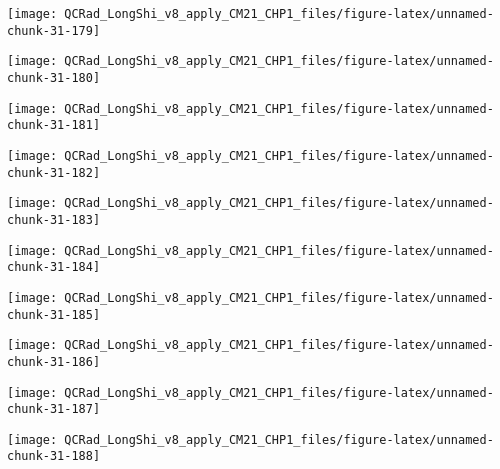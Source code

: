 \documentclass[
  10pt,
  a4paper,oneside]{article}
\begin{document}
\begin{center}\texttt{[image: QCRad\_LongShi\_v8\_apply\_CM21\_CHP1\_files/figure-latex/unnamed-chunk-31-179]} \end{center}

\begin{center}\texttt{[image: QCRad\_LongShi\_v8\_apply\_CM21\_CHP1\_files/figure-latex/unnamed-chunk-31-180]} \end{center}

\begin{center}\texttt{[image: QCRad\_LongShi\_v8\_apply\_CM21\_CHP1\_files/figure-latex/unnamed-chunk-31-181]} \end{center}

\begin{center}\texttt{[image: QCRad\_LongShi\_v8\_apply\_CM21\_CHP1\_files/figure-latex/unnamed-chunk-31-182]} \end{center}

\begin{center}\texttt{[image: QCRad\_LongShi\_v8\_apply\_CM21\_CHP1\_files/figure-latex/unnamed-chunk-31-183]} \end{center}

\begin{center}\texttt{[image: QCRad\_LongShi\_v8\_apply\_CM21\_CHP1\_files/figure-latex/unnamed-chunk-31-184]} \end{center}

\begin{center}\texttt{[image: QCRad\_LongShi\_v8\_apply\_CM21\_CHP1\_files/figure-latex/unnamed-chunk-31-185]} \end{center}

\begin{center}\texttt{[image: QCRad\_LongShi\_v8\_apply\_CM21\_CHP1\_files/figure-latex/unnamed-chunk-31-186]} \end{center}

\begin{center}\texttt{[image: QCRad\_LongShi\_v8\_apply\_CM21\_CHP1\_files/figure-latex/unnamed-chunk-31-187]} \end{center}

\begin{center}\texttt{[image: QCRad\_LongShi\_v8\_apply\_CM21\_CHP1\_files/figure-latex/unnamed-chunk-31-188]} \end{center}
\end{document}
